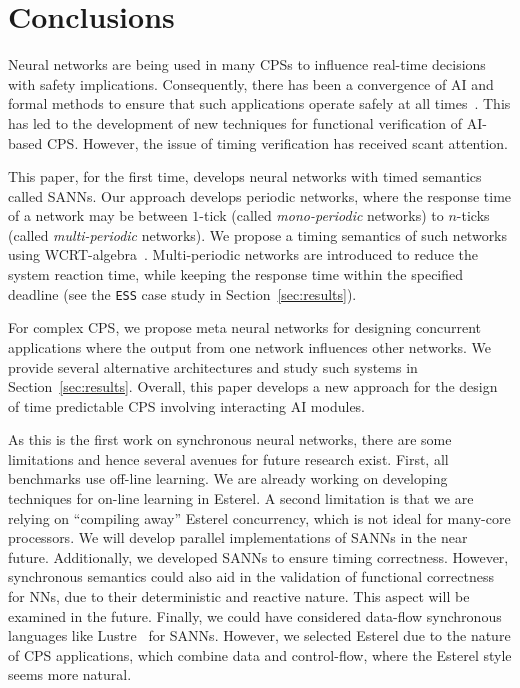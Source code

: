 \section{Conclusions}
\label{sec:conclusions}

Neural networks are being used in many \acfp{CPS} to influence
real-time decisions with safety implications. Consequently, there has
been a convergence of AI and formal methods to ensure that such
applications operate safely at all times~\cite{seshia2016towards}. This has led to the development of new
techniques for functional verification of AI-based \ac{CPS}. However,
the issue of timing verification has received scant attention. 

This paper, for the first time, develops neural networks with timed
semantics called \acfp{SANN}. Our approach develops periodic networks,
where the response time of a network may be between $1$-tick (called
\emph{mono-periodic} networks) to $n$-ticks (called
\emph{multi-periodic} networks). We propose a timing semantics of such
networks using \ac{WCRT}-algebra~\cite{wang2017timing}. Multi-periodic networks are
introduced to reduce the system reaction time, while keeping the
response time within the specified deadline (see the \texttt{ESS} case
study in Section~\ref{sec:results}). 

For complex CPS, we propose meta neural networks for designing concurrent applications where the output from
one network influences other networks. We provide several alternative
architectures and study such systems in
Section~\ref{sec:results}. Overall, this paper develops a new approach
for the design of time predictable \acf{CPS} involving interacting 
AI modules.

As this is the first work on synchronous neural networks,
there are some limitations and hence several avenues
for future research exist. First, all benchmarks use off-line learning. We are already
working on developing techniques for on-line learning in Esterel. A
second limitation is that we are relying on ``compiling away'' Esterel
concurrency, which is not ideal for many-core processors. We will develop parallel implementations
of \acp{SANN} in the near future. 
Additionally, we developed \acp{SANN} to ensure timing correctness. 
However, synchronous semantics could also aid in the
validation of functional correctness for \acp{NN}, due to their
deterministic and reactive nature. This aspect will be examined in the future.
Finally, we could have considered
data-flow synchronous languages like Lustre~\cite{benveniste2003synchronous} for
\acp{SANN}. However, we selected Esterel due to the nature of \ac{CPS}
applications, which combine data and control-flow, where the Esterel
style seems more natural.